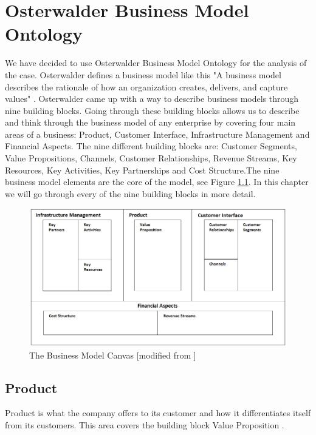 \chapter{Osterwalder Business Model Ontology}
We have decided to use Osterwalder Business Model Ontology for the analysis of the case. Osterwalder defines a business model like this "A business model describes the rationale of how an organization creates, delivers, and capture values" \cite{osterwalder}. Osterwalder came up with a way to describe business models through nine building blocks. Going through these building blocks allows us to describe and think through the business model of any enterprise by covering four main areas of a business:  Product, Customer Interface, Infrastructure Management and Financial Aspects. The nine different building blocks are: Customer Segments, Value Propositions, Channels, Customer Relationships, Revenue Streams, Key Resources, Key Activities, Key Partnerships and Cost Structure.The nine business model elements are the core of the model, see Figure \ref{fig:TheBusinessModelCanvas}. In this chapter we will go through every of the nine building blocks in more detail.


\begin{figure}[h]
\caption[The Business Model Canvas]{The Business Model Canvas [modified from \cite{osterwalder}]}
\label{fig:TheBusinessModelCanvas}
\begin{center}
\includegraphics[scale=0.6]{osterwaldersbmmodified}
\end{center}
\end{figure}
\newpage
\section{Product}
Product is what the company offers to its customer and how it differentiates itself from its customers. This area covers the building block Value Proposition \cite{osterwalderthesis}.

